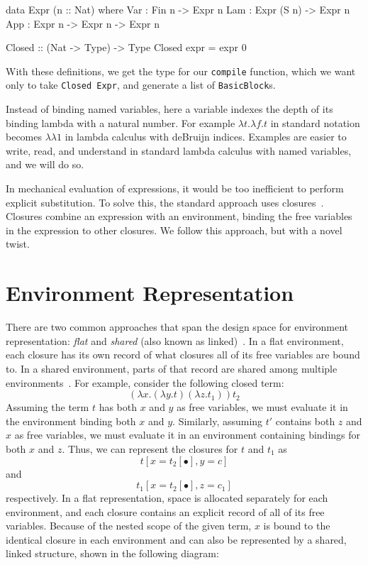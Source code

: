 \documentclass[preprint]{sigplanconf}
\begin{document}
\begin{code}
data Expr (n :: Nat) where
  Var : Fin n -> Expr n
  Lam : Expr (S n) -> Expr n 
  App : Expr n -> Expr n -> Expr n

Closed :: (Nat -> Type) -> Type
Closed expr = expr 0
\end{code}

With these definitions, we get the type for our \texttt{compile} function, which
we want only to take \texttt{Closed Expr}, and generate a list of
\texttt{BasicBlock}s.

Instead of binding named variables, here a variable indexes the depth of its
binding lambda with a natural number. For example $\lambda t.\lambda f.t$ in
standard notation becomes $\lambda\lambda1$ in lambda calculus with deBruijn
indices.  Examples are easier to write, read, and understand in standard lambda
calculus with named variables, and we will do so.

In mechanical evaluation of expressions, it would be too inefficient to perform
explicit substitution. To solve this, the standard approach uses
closures~\cite{landin1964mechanical, curien1991abstract, jonesstg, biernacka2007concrete}.
Closures combine an expression with an environment, binding the free
variables in the expression to other closures.  We follow this approach, but
with a novel twist. 

\section{Environment Representation} \label{sec:env}

There are two common approaches that span the design space for environment
representation: \emph{flat} and \emph{shared} (also
known as linked)~\cite{appel1988optimizing, shao1994space}. In a flat
environment, each closure has its own record of what closures all
of its free variables are bound to. In a shared environment, parts
of that record are shared among multiple environments~\cite{appel1988optimizing,
shao1994space}. For example, consider the following closed term: $$(\lambda
x.(\lambda y.t) (\lambda z.t_1)) t_2$$ Assuming the term $t$ has both $x$ and
$y$ as free variables, we must evaluate it in the environment binding both $x$
and $y$.  Similarly, assuming $t'$ contains both $z$ and $x$ as free variables,
we must evaluate it in an environment containing bindings for both $x$ and $z$.
Thus, we can represent the closures for $t$ and $t_1$ as $$t[x=t_2[\bullet],
y=c]$$ and $$t_1[x=t_2[\bullet], z=c_1]$$ respectively. In a flat
representation, space is allocated separately for each environment, and each
closure contains an explicit record of all of its free variables. Because of the
nested scope of the given term, $x$ is bound to the identical closure in each
environment and can also be represented by a shared, linked structure, shown in
the following diagram:
\end{document}

